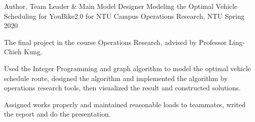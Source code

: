 

\begin{cventries}

  \cventry
    {Author, Team Leader \& Main Model Designer} %
    {Modeling the Optimal Vehicle Scheduling for YouBike2.0 for NTU Campus} %
    {Operations Research, NTU} %
    {Spring 2020} %
    {
      \begin{cvitems} %
        \item {The final project in the course Operations Research, 
            advised by Professor Ling-Chieh Kung.}
        \item {Used the Integer Programming and graph algorithm to model the 
            optimal vehicle schedule route, designed the algorithm and implemented
            the algorithm by operations research tools, then visualized the result and
            constructed solutions.}
        \item {Assigned works properly and maintained reasonable loads to teammates,
            writed the report and do the presentation.}
      \end{cvitems}
    }


\end{cventries}
